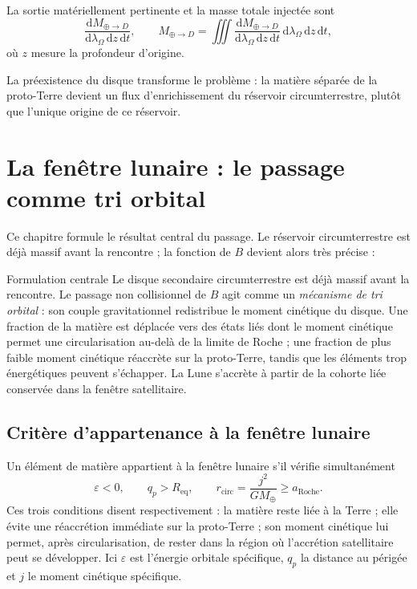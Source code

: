 \documentclass[11pt,a4paper,openany]{report}
\newcommand{\Mt}{M_{\oplus}}
\newcommand{\Req}{R_{\mathrm{eq}}}
\newcommand{\aR}{a_{\mathrm{Roche}}}
\newcommand{\dd}{\mathrm{d}}
\begin{document}
La sortie matériellement pertinente et la masse totale injectée sont
\begin{equation}
\frac{\dd M_{\oplus\to D}}{\dd\lambda_\Omega\,\dd z\,\dd t},
\qquad
M_{\oplus\to D}=\iiint\frac{\dd M_{\oplus\to D}}{\dd\lambda_\Omega\,\dd z\,\dd t}\,
\dd\lambda_\Omega\,\dd z\,\dd t,
\label{eq:flux}
\end{equation}
où $z$ mesure la profondeur d'origine.

\begin{ideephys}
La préexistence du disque transforme le problème : la matière séparée de la proto-Terre devient
un flux d'enrichissement du réservoir circumterrestre, plutôt que l'unique origine de ce
réservoir.
\end{ideephys}


\chapter{La fenêtre lunaire : le passage comme tri orbital}
\label{ch:fenetre}

Ce chapitre formule le résultat central du passage. Le réservoir circumterrestre est déjà massif
avant la rencontre ; la fonction de $B$ devient alors très précise :

\begin{principe}{Formulation centrale}
Le disque secondaire circumterrestre est déjà massif avant la rencontre. Le passage non
collisionnel de $B$ agit comme un \emph{mécanisme de tri orbital} : son couple gravitationnel
redistribue le moment cinétique du disque. Une fraction de la matière est déplacée vers des états
liés dont le moment cinétique permet une circularisation au-delà de la limite de Roche ; une
fraction de plus faible moment cinétique réaccrète sur la proto-Terre, tandis que les éléments trop
énergétiques peuvent s'échapper. La Lune s'accrète à partir de la cohorte liée conservée dans la
fenêtre satellitaire.
\end{principe}

\section{Critère d'appartenance à la fenêtre lunaire}

Un élément de matière appartient à la fenêtre lunaire s'il vérifie simultanément
\begin{equation}
\boxed{\;\varepsilon<0,\qquad q_p>\Req,\qquad r_{\mathrm{circ}}=\frac{j^2}{G\Mt}\ge\aR.\;}
\label{eq:fenetre}
\end{equation}
Ces trois conditions disent respectivement : la matière reste liée à la Terre ; elle évite une
réaccrétion immédiate sur la proto-Terre ; son moment cinétique lui permet, après
circularisation, de rester dans la région où l'accrétion satellitaire peut se développer. Ici
$\varepsilon$ est l'énergie orbitale spécifique, $q_p$ la distance au périgée et $j$ le moment
cinétique spécifique.
\end{document}
